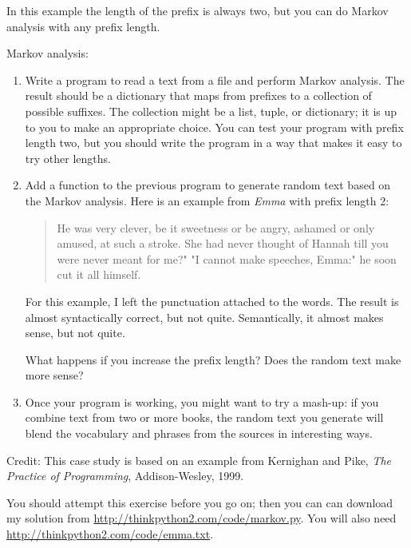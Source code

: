 \documentclass[10pt]{book}
\begin{document}
In this example the length of the prefix is always two, but
you can do Markov analysis with any prefix length.

\begin{exercise}

Markov analysis:

\begin{enumerate}

\item Write a program to read a text from a file and perform Markov
analysis.  The result should be a dictionary that maps from
prefixes to a collection of possible suffixes.  The collection
might be a list, tuple, or dictionary; it is up to you to make
an appropriate choice.  You can test your program with prefix
length two, but you should write the program in a way that makes
it easy to try other lengths.

\item Add a function to the previous program to generate random text
based on the Markov analysis.  Here is an example from {\em Emma}
with prefix length 2:

\begin{quote}
He was very clever, be it sweetness or be angry, ashamed or only
amused, at such a stroke. She had never thought of Hannah till you
were never meant for me?" "I cannot make speeches, Emma:" he soon cut
it all himself.
\end{quote}

For this example, I left the punctuation attached to the words.
The result is almost syntactically correct, but not quite.
Semantically, it almost makes sense, but not quite.

What happens if you increase the prefix length?  Does the random
text make more sense?

\item Once your program is working, you might want to try a mash-up:
if you combine text from two or more books, the random
text you generate will blend the vocabulary and phrases from
the sources in interesting ways.

\end{enumerate}

Credit: This case study is based on an example from Kernighan and
Pike, {\em The Practice of Programming}, Addison-Wesley, 1999.

\end{exercise}

You should attempt this exercise before you go on; then you can can
download my solution from \url{http://thinkpython2.com/code/markov.py}.
You will also need \url{http://thinkpython2.com/code/emma.txt}.
\end{document}
